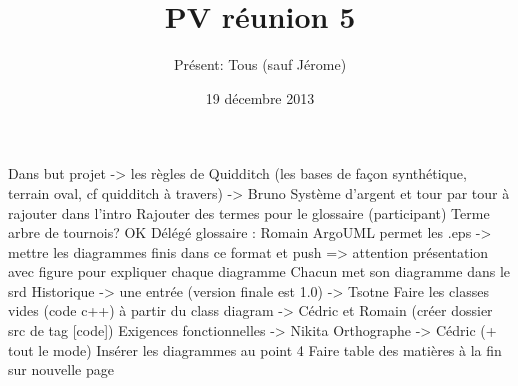 \documentclass[a4paper,10pt]{article}
\author{Présent: Tous (sauf Jérome)}
\title{PV réunion 5}
\date{19 décembre 2013}
\begin{document}
\maketitle
Dans but projet -> les règles de Quidditch (les bases de façon synthétique, terrain oval, cf quidditch à travers) -> Bruno
Système d'argent et tour par tour à rajouter dans l'intro
Rajouter des termes pour le glossaire (participant)
Terme arbre de tournois? OK
Délégé glossaire : Romain
ArgoUML permet les .eps -> mettre les diagrammes finis dans ce format et push
=> attention présentation avec figure pour expliquer chaque diagramme
Chacun met son diagramme dans le srd
Historique -> une entrée (version finale est 1.0) -> Tsotne
Faire les classes vides (code c++) à partir du class diagram -> Cédric et Romain
(créer dossier src de tag [code])
Exigences fonctionnelles -> Nikita
Orthographe -> Cédric (+ tout le mode)
Insérer les diagrammes au point 4
Faire table des matières à la fin sur nouvelle page
\end{document}
